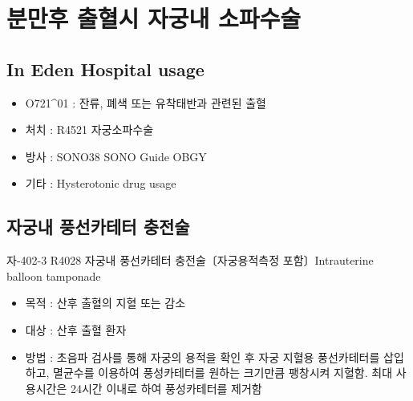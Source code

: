 \section{분만후 출혈시 자궁내 소파수술}

\subsection{In Eden Hospital usage}
\begin{itemize}\tightlist
\item O721\^{}01 : 잔류, 폐색 또는 유착태반과 관련된 출혈
\item 처치 : R4521 자궁소파수술
\item 방사 : SONO38 SONO Guide OBGY
\item 기타 : Hysterotonic drug usage
\end{itemize}
\prezi{\clearpage}
\subsection{자궁내 풍선카테터 충전술}
자-402-3 R4028 자궁내 풍선카테터 충전술〔자궁용적측정 포함〕Intrauterine balloon tamponade
\begin{itemize}\tightlist
\item 목적 : 산후 출혈의 지혈 또는 감소
\item 대상 : 산후 출혈 환자
\item 방법 : 초음파 검사를 통해 자궁의 용적을 확인 후 자궁 지혈용 풍선카테터를 삽입하고, 멸균수를 이용하여 풍성카테터를 원하는 크기만큼 팽창시켜 지혈함. 최대 사용시간은 24시간 이내로 하여 풍성카테터를 제거함
\end{itemize}